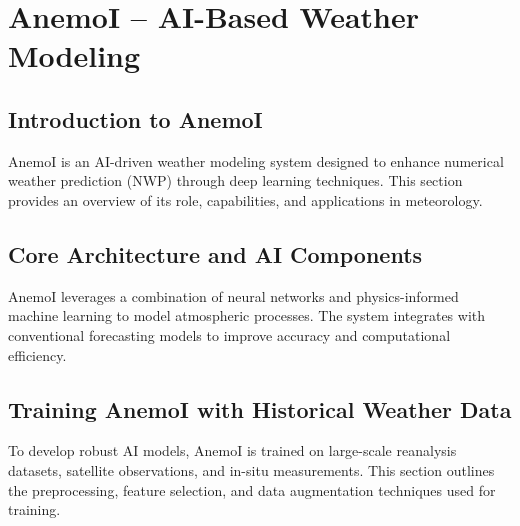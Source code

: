 \chapter{AnemoI – AI-Based Weather Modeling}

\section{Introduction to AnemoI}
AnemoI is an AI-driven weather modeling system designed to enhance numerical weather prediction (NWP) through deep learning techniques. This section provides an overview of its role, capabilities, and applications in meteorology.

\section{Core Architecture and AI Components}
AnemoI leverages a combination of neural networks and physics-informed machine learning to model atmospheric processes. The system integrates with conventional forecasting models to improve accuracy and computational efficiency.

\section{Training AnemoI with Historical Weather Data}
To develop robust AI models, AnemoI is trained on large-scale reanalysis datasets, satellite observations, and in-situ measurements. This section outlines the preprocessing, feature selection, and data augmentation techniques used for training.


